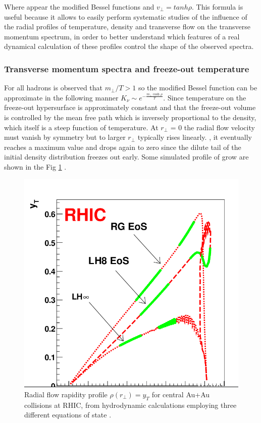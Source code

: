 \documentclass[12pt,a4paper]{book}
\begin{document}
	Where appear the modified Bessel functions and $v_\perp= tanh \rho$. This formula is useful because it allows to easily perform systematic studies of the influence of the radial profiles of temperature, density and transverse flow on the transverse momentum spectrum, in order to better understand which features of a real dynamical calculation of these profiles control the shape of the observed spectra.
	
	\subsubsection{Transverse momentum spectra and freeze-out temperature}
	For all hadrons is observed that $m_\perp/T >1$ so the modified Bessel function can be approximate in the following manner $K_\nu \sim e^{- \frac{m_\perp \cosh \rho}{T}}$. Since  temperature on the freeze-out hypersurface is approximately constant and that the freeze-out volume is controlled by the mean free path which is inversely proportional to the density, which itself is a steep function of temperature. At $r_\perp$ = 0 the radial flow velocity must vanish by symmetry but to larger $r_\perp$ typically rises	linearly. , it eventually reaches a maximum value and drops again to zero since the dilute tail of the initial density distribution freezes out early. Some simulated profile of grow are shown in the Fig \ref{fig:radial_flow} \cite{teaney2001hydrodynamicdescriptionheavyion}.
	
	\begin{figure}[ht]
		\centering
		\includegraphics[width=0.4\linewidth]{pictures/radial_flow.png}
		\caption{Radial flow rapidity profile $\rho(r_\perp)= y_T$ for central Au+Au collisions at RHIC, from hydrodynamic calculations employing three different equations of state \cite{EvolutionofcollisionsandQGP}.}
		\label{fig:radial_flow} 
	\end{figure}
	
\end{document}
